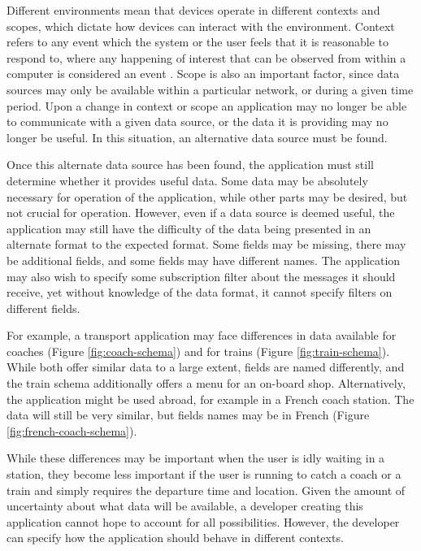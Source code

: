 \documentclass[12pt,twoside,notitlepage]{report}
\begin{document}
Different environments mean that devices operate in different contexts and scopes, which dictate how devices can interact with the environment. 
Context refers to any event which the system or the user feels that it is reasonable to respond to, where any happening of interest that can be observed from within a computer is considered an event \cite[page 11]{Muhl:2006:DES:1162246}.
Scope is also an important factor, since data sources may only be available within a particular network, or during a given time period. 
Upon a change in context or scope an application may no longer be able to communicate with a given data source, or the data it is providing may no longer be useful. 
In this situation, an alternative data source must be found.

Once this alternate data source has been found, the application must still determine whether it provides useful data. 
Some data may be absolutely necessary for operation of the application, while other parts may be desired, but not crucial for operation.  
However, even if a data source is deemed useful, the application may still have the difficulty of the data being presented in an alternate format to the expected format. 
Some fields may be missing, there may be additional fields, and some fields may have different names. 
The application may also wish to specify some subscription filter about the messages it should receive, yet without knowledge of the data format, it cannot specify filters on different fields.

For example, a transport application may face differences in data available for coaches (Figure \ref{fig:coach-schema}) and for trains (Figure \ref{fig:train-schema}). 
While both offer similar data to a large extent, fields are named differently, and the train schema additionally offers a menu for an on-board shop.
Alternatively, the application might be used abroad, for example in a French coach station. The data will still be very similar, but fields names may be in French (Figure \ref{fig:french-coach-schema}).

While these differences may be important when the user is idly waiting in a station, they become less important if the user is running to catch a coach or a train and simply requires the departure time and location.
Given the amount of uncertainty about what data will be available, a developer creating this application cannot hope to account for all possibilities. 
However, the developer can specify how the application should behave in different contexts.
\end{document}
